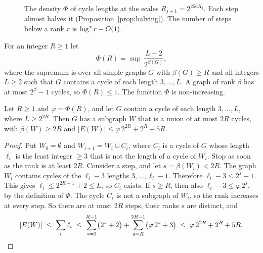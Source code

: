 \documentclass[11pt]{article}
\begin{document}
\begin{figure}[ht]
\centering
{}
\caption{The density $\Phi$ of cycle lengths at the scales $R_{j+1}=2^{256R_j}$. Each step almost
halves it (Proposition~\ref{prop:halving}). The number of steps below a rank $r$ is $\log^{*} r-O(1)$.}
\label{fig:tower}
\end{figure}

For an integer $R\ge1$ let
\[
  \Phi(R)=\sup\,\frac{L-2}{2^{\beta(G)}} ,
\]
where the supremum is over all simple graphs $G$ with $\beta(G)\ge R$ and all integers $L\ge2$ such
that $G$ contains a cycle of each length $3,\dots,L$. A graph of rank $\beta$ has at most
$2^{\beta}-1$ cycles, so $\Phi(R)\le1$. The function $\Phi$ is non-increasing.

\begin{lemma}[Witness]\label{lem:witness}
Let $R\ge1$ and $\varphi=\Phi(R)$, and let $G$ contain a cycle of each length $3,\dots,L$, where
$L\ge2^{2R}$. Then $G$ has a subgraph $W$ that is a union of at most $2R$ cycles, with
$\beta(W)\ge2R$ and $|E(W)|\le\varphi\,2^{2R}+2^{R}+5R$.
\end{lemma}

\begin{proof}
Put $W_0=\emptyset$ and $W_{i+1}=W_i\cup C_i$, where $C_i$ is a cycle of $G$ whose length $\ell_i$ is
the least integer $\ge3$ that is not the length of a cycle of $W_i$. Stop as soon as the rank is at
least $2R$. Consider a step, and let $s=\beta(W_i)<2R$. The graph $W_i$ contains cycles of the
$\ell_i-3$ lengths $3,\dots,\ell_i-1$. Therefore $\ell_i-3\le2^{s}-1$. This gives
$\ell_i\le2^{2R-1}+2\le L$, so $C_i$ exists. If $s\ge R$, then also $\ell_i-3\le\varphi\,2^{s}$, by
the definition of $\Phi$. The cycle $C_i$ is not a subgraph of $W_i$, so the rank increases at every
step. So there are at most $2R$ steps, their ranks $s$ are distinct, and
\[
  |E(W)|\;\le\;\sum_i\ell_i\;\le\;\sum_{s=0}^{R-1}\bigl(2^{s}+2\bigr)+\sum_{s=R}^{2R-1}\bigl(\varphi\,2^{s}+3\bigr)
  \;\le\;\varphi\,2^{2R}+2^{R}+5R .\qedhere
\]
\end{proof}
\end{document}
